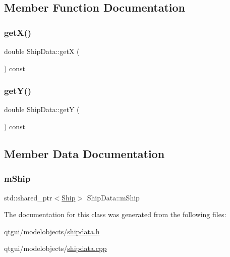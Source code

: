 \subsection{Member Function Documentation}
\mbox{\label{class_ship_data_a309ae25057aa3c5297ba34a827a7f3d2}} 
\subsubsection{\texorpdfstring{getX()}{getX()}}
{\footnotesize\ttfamily double Ship\+Data\+::getX (\begin{DoxyParamCaption}{ }\end{DoxyParamCaption}) const}

\mbox{\label{class_ship_data_a9c4282e6c957373f48c247fcde166785}} 
\subsubsection{\texorpdfstring{getY()}{getY()}}
{\footnotesize\ttfamily double Ship\+Data\+::getY (\begin{DoxyParamCaption}{ }\end{DoxyParamCaption}) const}



\subsection{Member Data Documentation}
\mbox{\label{class_ship_data_a4ab7b51aed7b54566f209dfac24a4100}} 
\subsubsection{\texorpdfstring{mShip}{mShip}}
{\footnotesize\ttfamily std\+::shared\+\_\+ptr$<$\mbox{\hyperlink{class_ship}{Ship}}$>$ Ship\+Data\+::m\+Ship}



The documentation for this class was generated from the following files\+:\begin{DoxyCompactItemize}
\item 
qtgui/modelobjects/\mbox{\hyperlink{shipdata_8h}{shipdata.\+h}}\item 
qtgui/modelobjects/\mbox{\hyperlink{shipdata_8cpp}{shipdata.\+cpp}}\end{DoxyCompactItemize}
